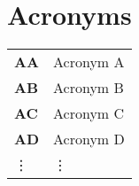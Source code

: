 \documentclass[bookType,partialBuild]{../ThesisClass/ThesisClass}
\begin{document}
\fi
\ifdefined \bookType
	\cleardoublepage
\fi



\chapter*{Acronyms}

{
\renewcommand{\arraystretch}{1.1}
\begin{longtable}{ll}
\textbf{AA}            & Acronym A  \\
\textbf{AB}            & Acronym B  \\
\textbf{AC}            & Acronym C  \\
\textbf{AD}            & Acronym D  \\
\vdots                 & \vdots     \\

\end{longtable}
}


\ifdefined \partialBuild
	
\end{document}
